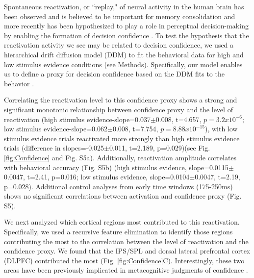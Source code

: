 Spontaneous reactivation, or ``replay," of neural activity in the human brain has been observed and is believed to be important for memory consolidation \cite{Deuker2013} and more recently has been hypothesized to play a role in perceptual decision-making by enabling the formation of decision confidence \cite{Fleming2012}. To test the hypothesis that the reactivation activity we see may be related to decision confidence, we used a hierarchical drift diffusion model (DDM) \cite{Ratcliff2008,Wiecki2013} to fit the behavioral data for high and low stimulus evidence conditions (see Methods).  Specifically, our model enables us to define a proxy for decision confidence based on the DDM fits to the behavior \cite{Kiani2014,Philiastides2014}. 

Correlating the reactivation level to this confidence proxy shows a strong and significant monotonic relationship between confidence proxy and the level of reactivation (high stimulus evidence-slope=0.037$\pm$0.008, t=4.657, $p=3.2x10^{-6}$; low stimulus evidence-slope=0.062$\pm$0.008, t=7.754, $p=8.88x10^{-15}$), with low stimulus evidence trials reactivated more strongly than high stimulus evidence trials (difference in slopes=-0.025$\pm$0.011, t=2.189, p=0.029)(see Fig. \ref{fig:Confidence} and Fig. S5a). Additionally, reactivation amplitude correlates with behavioral accuracy (Fig. S5b) (high stimulus evidence, slope=0.0115$\pm$0.0047, t=2.41, p=0.016; low stimulus evidence, slope=0.0104$\pm$0.0047, t=2.19, p=0.028).  Additional control analyses from early time windows (175-250ms) shows no significant correlations between activation and confidence proxy (Fig. S5).

We next analyzed which cortical regions most contributed to this reactivation. Specifically, we used a recursive feature elimination to identify those regions contributing the most to the correlation between the level of reactivation and the confidence proxy.  We found that the IPS/SPL and dorsal lateral prefrontal cortex (DLPFC) contributed the most (Fig. \ref{fig:Confidence}C). Interestingly, these two areas have been previously implicated in metacognitive judgments of confidence \cite{Fleming2012,Steinhauser2010,Yeung2012}.

